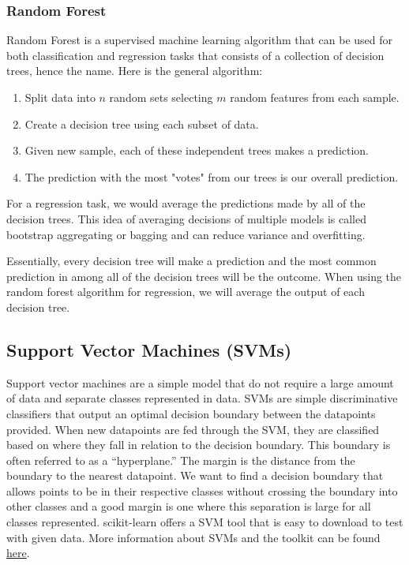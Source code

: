 \documentclass{article}
\begin{document}
\subsubsection{Random Forest}
Random Forest is a supervised machine learning algorithm that can be used for both classification and regression tasks that consists of a collection of decision trees, hence the name. Here is the general algorithm:

\begin{enumerate}
    \item Split data into $n$ random sets selecting $m$ random features from each sample.
    \item Create a decision tree using each subset of data.
    \item Given new sample, each of these independent trees makes a prediction.
    \item The prediction with the most "votes" from our trees is our overall prediction.
\end{enumerate}

For a regression task, we would average the predictions made by all of the decision trees. This idea of averaging decisions of multiple models is called bootstrap aggregating or bagging and can reduce variance and overfitting.

Essentially, every decision tree will make a prediction and the most common prediction in among all of the decision trees will be the outcome. When using the random forest algorithm for regression, we will average the output of each decision tree. 

\newpage
\subsection{Support Vector Machines (SVMs)} 
Support vector machines are a simple model that do not require a large amount of data and separate classes represented in data. SVMs are simple discriminative classifiers that output an optimal decision boundary between the datapoints provided. When new datapoints are fed through the SVM, they are classified based on where they fall in relation to the decision boundary. This boundary is often referred to as a ``hyperplane.''  The margin is the distance from the boundary to the nearest datapoint. We want to find a decision boundary that allows points to be in their respective classes without crossing the boundary into other classes and a good margin is one where this separation is large for all classes represented. scikit-learn offers a SVM tool that is easy to download to test with given data. More information about SVMs and the toolkit can be found \href{https://scikit-learn.org/stable/modules/svm.html}{here}.
\end{document}
